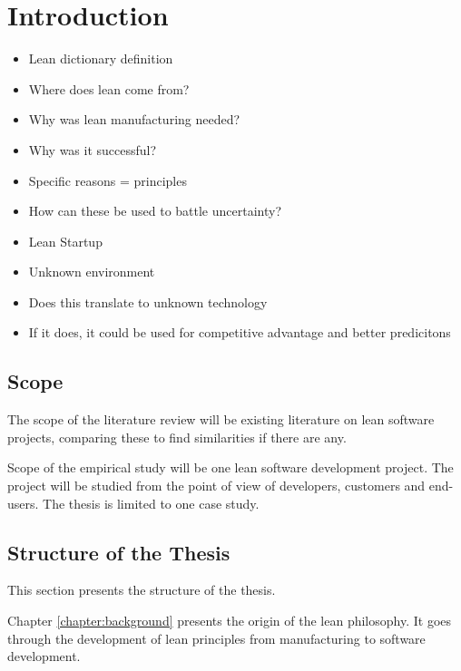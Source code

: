 

\chapter{Introduction}
\label{chapter:intro}


\begin{itemize}
  \item{Lean dictionary definition}
  \item{Where does lean come from?}
  \item{Why was lean manufacturing needed?}
  \item{Why was it successful?}
  \item{Specific reasons = principles}
  \item{How can these be used to battle uncertainty?}
  \item{Lean Startup}
  \item{Unknown environment}
  \item{Does this translate to unknown technology}
  \item{If it does, it could be used for competitive advantage and better predicitons}
\end{itemize}

\section{Scope}
\label{section:scope}

The scope of the literature review will be existing literature on lean software projects, comparing these to find similarities if there are any.

Scope of the empirical study will be one lean software development project. The project will be studied from the point of view of developers, customers and end-users. The thesis is limited to one case study.

\section{Structure of the Thesis}
\label{section:structure}

This section presents the structure of the thesis.\\


Chapter \ref{chapter:background} presents the origin of the lean philosophy. It goes through the development of lean principles from manufacturing to software development.

